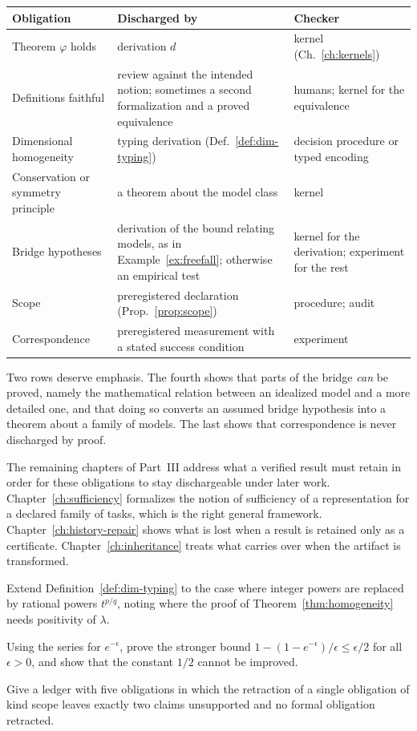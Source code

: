 \begin{center}
\small
\begin{tabular}{p{3.1cm}p{4.0cm}p{5.0cm}}
\toprule
Obligation & Discharged by & Checker\\
\midrule
Theorem $\varphi$ holds & derivation $d$ & kernel (Ch.~\ref{ch:kernels})\\
Definitions faithful & review against the intended notion; sometimes a second formalization and a proved equivalence & humans; kernel for the equivalence\\
Dimensional homogeneity & typing derivation (Def.~\ref{def:dim-typing}) & decision procedure or typed encoding\\
Conservation or symmetry principle & a theorem about the model class & kernel\\
Bridge hypotheses & derivation of the bound relating models, as in Example~\ref{ex:freefall}; otherwise an empirical test & kernel for the derivation; experiment for the rest\\
Scope & preregistered declaration (Prop.~\ref{prop:scope}) & procedure; audit\\
Correspondence & preregistered measurement with a stated success condition & experiment\\
\bottomrule
\end{tabular}
\end{center}

Two rows deserve emphasis. The fourth shows that parts of the bridge \emph{can} be proved, namely the mathematical relation between an idealized model and a more detailed one, and that doing so converts an assumed bridge hypothesis into a theorem about a family of models. The last shows that correspondence is never discharged by proof.

The remaining chapters of Part~III address what a verified result must retain in order for these obligations to stay dischargeable under later work. Chapter~\ref{ch:sufficiency} formalizes the notion of sufficiency of a representation for a declared family of tasks, which is the right general framework. Chapter~\ref{ch:history-repair} shows what is lost when a result is retained only as a certificate. Chapter~\ref{ch:inheritance} treats what carries over when the artifact is transformed.

\begin{exercise}
Extend Definition~\ref{def:dim-typing} to the case where integer powers are replaced by rational powers $t^{p/q}$, noting where the proof of Theorem~\ref{thm:homogeneity} needs positivity of $\lambda$.
\end{exercise}

\begin{exercise}
Using the series for $e^{-\epsilon}$, prove the stronger bound $1-(1-e^{-\epsilon})/\epsilon\le\epsilon/2$ for all $\epsilon>0$, and show that the constant $1/2$ cannot be improved.
\end{exercise}

\begin{exercise}
Give a ledger with five obligations in which the retraction of a single obligation of kind scope leaves exactly two claims unsupported and no formal obligation retracted.
\end{exercise}
